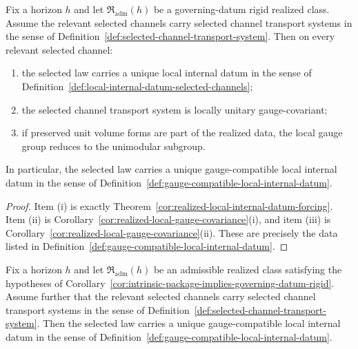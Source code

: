 \begin{theorem}
\label{thm:gauge-compatible-local-datum-forcing}
Fix a horizon $h$ and let $\mathfrak R_{\mathrm{adm}}(h)$ be a governing-datum
rigid realized class. Assume the relevant selected channels carry selected
channel transport systems in the sense of
Definition~\ref{def:selected-channel-transport-system}. Then on every relevant
selected channel:
\begin{enumerate}[label=(\roman*), leftmargin=2em, itemsep=0.2em]
\item the selected law carries a unique local internal datum in the sense of
      Definition~\ref{def:local-internal-datum-selected-channels};
\item the selected channel transport system is locally unitary gauge-covariant;
\item if preserved unit volume forms are part of the realized data, the local
      gauge group reduces to the unimodular subgroup.
\end{enumerate}
In particular, the selected law carries a unique gauge-compatible local
internal datum in the sense of
Definition~\ref{def:gauge-compatible-local-internal-datum}.
\end{theorem}

\begin{proof}
Item (i) is exactly
Theorem~\ref{cor:realized-local-internal-datum-forcing}. Item (ii) is
Corollary~\ref{cor:realized-local-gauge-covariance}(i), and item (iii) is
Corollary~\ref{cor:realized-local-gauge-covariance}(ii). These are precisely
the data listed in
Definition~\ref{def:gauge-compatible-local-internal-datum}.
\end{proof}

\begin{corollary}
\label{cor:intrinsic-package-yields-gauge-compatible-local-datum}
Fix a horizon $h$ and let $\mathfrak R_{\mathrm{adm}}(h)$ be an admissible
realized class satisfying the hypotheses of
Corollary~\ref{cor:intrinsic-package-implies-governing-datum-rigid}. Assume
further that the relevant selected channels carry selected channel transport
systems in the sense of
Definition~\ref{def:selected-channel-transport-system}. Then the selected law
carries a unique gauge-compatible local internal datum in the sense of
Definition~\ref{def:gauge-compatible-local-internal-datum}.
\end{corollary}

